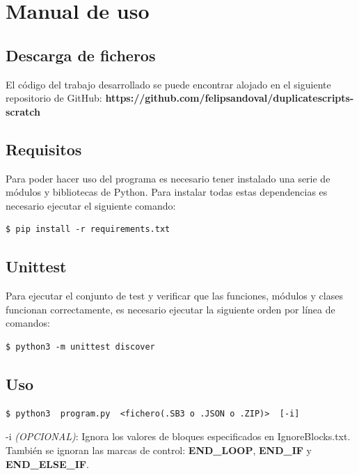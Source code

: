 \documentclass[a4paper, 12pt]{book}
\begin{document}

\cleardoublepage
\appendix

\chapter{Manual de uso}
\label{app:manual}


\section{Descarga de ficheros}
El código del trabajo desarrollado se puede encontrar alojado en el siguiente repositorio de GitHub: \textbf{https://github.com/felipsandoval/duplicatescripts-scratch}

\section{Requisitos}

Para poder hacer uso del programa es necesario tener instalado una serie de módulos y bibliotecas de Python. Para instalar todas estas dependencias es necesario ejecutar el siguiente comando:

\begin{lstlisting}[style=consola,numbers=none]
$ pip install -r requirements.txt
\end{lstlisting}

\section{Unittest}

Para ejecutar el conjunto de test y verificar que las funciones, módulos y clases funcionan correctamente, es necesario ejecutar la siguiente orden por línea de comandos:

\begin{lstlisting}[style=consola,numbers=none]
$ python3 -m unittest discover
\end{lstlisting}

\newpage 

\section{Uso}

\begin{lstlisting}[style=consola,numbers=none]
$ python3  program.py  <fichero(.SB3 o .JSON o .ZIP)>  [-i]
\end{lstlisting}

-i \textit{(OPCIONAL)}: Ignora los valores de bloques especificados en IgnoreBlocks.txt. También se ignoran las marcas de control: \textbf{END\_LOOP}, \textbf{END\_IF} y \textbf{END\_ELSE\_IF}.
\end{document}
